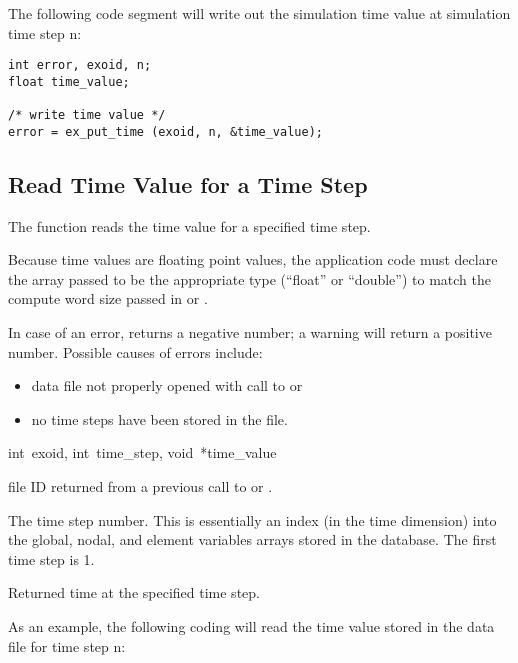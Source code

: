 The following code segment will write out the simulation time value at
simulation time step n:

\begin{lstlisting}
int error, exoid, n;
float time_value;

/* write time value */
error = ex_put_time (exoid, n, &time_value);
\end{lstlisting}


\subsection{Read Time Value for a Time Step}

The function  reads the time value for a
specified time step.

Because time values are floating point values, the application code
must declare the array passed to be the appropriate type (``float'' or
``double'') to match the compute word size passed in
 or .

In case of an error,  returns a negative number;
a warning will return a positive number. Possible causes of errors
include:

\begin{itemize}
 \item data file not properly opened with call to 
 or 

 \item no time steps have been stored in the file.
\end{itemize}

{int~exoid, 
int~time_step, 
void~*time_value}

\begin{parameters}
\item[{int exoid \R{}}]
\exo{} file ID returned from a previous call to  
or . 

\item[{int time_step \R{}}]
The time step number. This is essentially an index (in the time
dimension) into the global, nodal, and element variables arrays stored
in the database. The first time step is 1.

\item[{void* time_value \W{}}]
Returned time at the specified time step.
\end{parameters}

As an example, the following coding will read the time value stored in
the data file for time step n:

